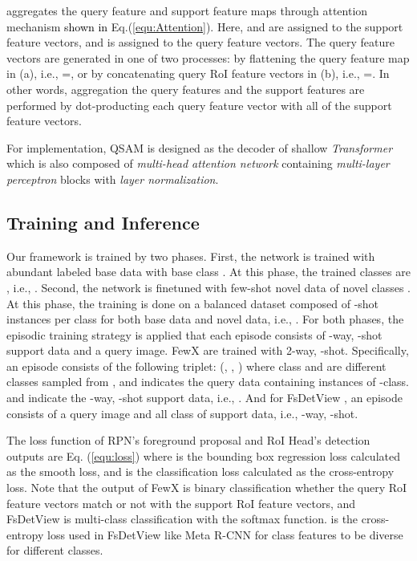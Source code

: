 \documentclass[10pt,twocolumn,letterpaper]{article}
\newcommand{\nj}[1]{\textcolor{black}{#1}}
\newcommand{\hj}[1]{\textcolor{black}{#1}}
\begin{document}
\vspace{+0.15cm}
 aggregates the query feature and support feature maps through attention mechanism \nj{shown in} Eq.(\ref{equ:Attention}). Here,  and  are assigned to the support feature vectors, and  is assigned to the query feature vectors. The query feature vectors are generated in one of two processes: by flattening the query feature map in (a), i.e.,
\hj{=}, 
or by concatenating query RoI feature vectors in (b), i.e., =. In other words, aggregation the query features and the support features are performed by dot-producting each query feature vector with all of the support feature vectors. 

For implementation, QSAM is designed as the decoder of shallow \emph{Transformer} which is also composed of \emph{multi-head attention network} containing \emph{multi-layer perceptron} blocks with \emph{layer normalization}.






\subsection{Training and Inference}
\label{subsec:objective}

 \quad Our framework is trained by two phases. First, the network is trained with abundant labeled base data  with base class . At this phase, the trained classes are , i.e., .
Second, the network is finetuned with few-shot novel data  of novel classes . At this phase, the training is done on a balanced dataset composed of -shot instances per class for both base data and novel data, i.e., .
For both phases, the episodic training strategy is applied that each episode consists of -way, -shot support data and a query image. FewX \cite{fan2020fsod} are trained with 2-way, -shot. Specifically, an episode consists of the following triplet: (, , ) where class  and  are different classes sampled from , and  indicates the query data containing instances of -class.  and  indicate the -way, -shot support data, i.e., . And for FsDetView \cite{xiao2020few}, an episode consists of a query image and all class of support data, i.e., -way, -shot.

\vspace{+0.15cm}
 \quad The loss function of RPN's foreground proposal and RoI Head's detection outputs are Eq. (\ref{equ:loss}) where  is the bounding box regression loss calculated as the smooth  loss, and  is the classification loss calculated as the cross-entropy loss. Note that the output of FewX is binary classification whether the query RoI feature vectors match or not with the support RoI feature vectors, and FsDetView is multi-class classification with the softmax function.  is the cross-entropy loss used in FsDetView like Meta R-CNN \cite{yan2019meta} for class features to be diverse for different classes.
\end{document}
